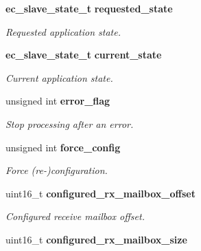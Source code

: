 \begin{DoxyCompactItemize}
{\bf ec\-\_\-slave\-\_\-state\-\_\-t} {\bf requested\-\_\-state}
\begin{DoxyCompactList}\small\item\em Requested application state. \end{DoxyCompactList}\item 
{\bf ec\-\_\-slave\-\_\-state\-\_\-t} {\bf current\-\_\-state}
\begin{DoxyCompactList}\small\item\em Current application state. \end{DoxyCompactList}\item 
unsigned int {\bf error\-\_\-flag}
\begin{DoxyCompactList}\small\item\em Stop processing after an error. \end{DoxyCompactList}\item 
unsigned int {\bf force\-\_\-config}
\begin{DoxyCompactList}\small\item\em Force (re-\/)configuration. \end{DoxyCompactList}\item 
uint16\-\_\-t {\bf configured\-\_\-rx\-\_\-mailbox\-\_\-offset}
\begin{DoxyCompactList}\small\item\em Configured receive mailbox offset. \end{DoxyCompactList}\item 
uint16\-\_\-t {\bf configured\-\_\-rx\-\_\-mailbox\-\_\-size}\label{structec__slave_a0310afbbf38da2a92cdbe3911a46535c}


\end{DoxyCompactItemize}
